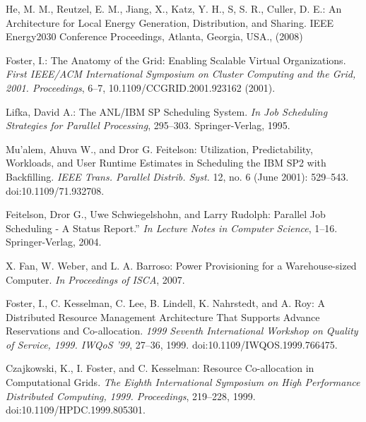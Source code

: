 \documentclass{llncs}
\begin{document}
\newpage



%

%
%
\begin{thebibliography}{3}
%
He, M. M., Reutzel, E. M., Jiang, X., Katz, Y. H., S, S. R., Culler, D. E.:
An Architecture for Local Energy Generation, Distribution, and Sharing. 
IEEE Energy2030 Conference Proceedings, Atlanta, Georgia, USA., (2008)

 Foster, I.:
The Anatomy of the Grid: Enabling Scalable Virtual Organizations.
\textit{First IEEE/ACM International Symposium on Cluster Computing and the Grid, 2001. Proceedings}, 6--7,
10.1109/CCGRID.2001.923162 (2001).

Lifka, David A.:
The ANL/IBM SP Scheduling System.
\textit{In Job Scheduling Strategies for Parallel Processing}, 295--303.  Springer-Verlag, 1995.


Mu'alem, Ahuva W., and Dror G. Feitelson:
Utilization, Predictability, Workloads, and User Runtime Estimates in Scheduling the IBM SP2 with Backfilling.
\textit{IEEE Trans. Parallel Distrib. Syst.} 12, no. 6 (June 2001): 529--543.
doi:10.1109/71.932708.

Feitelson, Dror G., Uwe Schwiegelshohn, and Larry Rudolph:
Parallel Job Scheduling - A Status Report.''
\textit{In Lecture Notes in Computer Science}, 1--16. Springer-Verlag, 2004.

X. Fan, W. Weber, and L. A. Barroso:
Power Provisioning for a Warehouse-sized Computer.
\textit{In Proceedings of ISCA}, 2007.

Foster, I., C. Kesselman, C. Lee, B. Lindell, K. Nahrstedt, and A.  Roy:
A Distributed Resource Management Architecture That Supports Advance Reservations and Co-allocation.
\textit{1999 Seventh International Workshop on Quality of Service, 1999. IWQoS '99}, 27--36, 1999.
doi:10.1109/IWQOS.1999.766475.

Czajkowski, K., I. Foster, and C. Kesselman:
Resource Co-allocation in Computational Grids.
\textit{The Eighth International Symposium on High Performance Distributed Computing, 1999. Proceedings}, 219--228, 1999.
doi:10.1109/HPDC.1999.805301.



\end{thebibliography}
\end{document}
